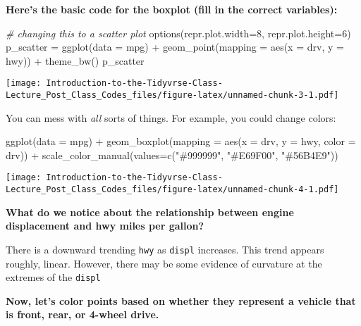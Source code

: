 \documentclass[
]{article}
\newenvironment{Shaded}{\begin{snugshade}}{\end{snugshade}}
\newcommand{\AttributeTok}[1]{\textcolor[rgb]{0.77,0.63,0.00}{#1}}
\newcommand{\CommentTok}[1]{\textcolor[rgb]{0.56,0.35,0.01}{\textit{#1}}}
\newcommand{\DecValTok}[1]{\textcolor[rgb]{0.00,0.00,0.81}{#1}}
\newcommand{\FunctionTok}[1]{\textcolor[rgb]{0.00,0.00,0.00}{#1}}
\newcommand{\NormalTok}[1]{#1}
\newcommand{\OtherTok}[1]{\textcolor[rgb]{0.56,0.35,0.01}{#1}}
\newcommand{\SpecialCharTok}[1]{\textcolor[rgb]{0.00,0.00,0.00}{#1}}
\newcommand{\StringTok}[1]{\textcolor[rgb]{0.31,0.60,0.02}{#1}}
\begin{document}
\textbf{Here's the basic code for the boxplot (fill in the correct
variables):}

\begin{Shaded}
\begin{Highlighting}[]
\CommentTok{\# changing this to a scatter plot }
\FunctionTok{options}\NormalTok{(}\AttributeTok{repr.plot.width=}\DecValTok{8}\NormalTok{, }\AttributeTok{repr.plot.height=}\DecValTok{6}\NormalTok{)}
\NormalTok{p\_scatter }\OtherTok{=} \FunctionTok{ggplot}\NormalTok{(}\AttributeTok{data =}\NormalTok{ mpg) }\SpecialCharTok{+} 
  \FunctionTok{geom\_point}\NormalTok{(}\AttributeTok{mapping =} \FunctionTok{aes}\NormalTok{(}\AttributeTok{x =}\NormalTok{ drv, }\AttributeTok{y =}\NormalTok{ hwy)) }\SpecialCharTok{+} 
  \FunctionTok{theme\_bw}\NormalTok{()}
\NormalTok{p\_scatter}
\end{Highlighting}
\end{Shaded}

\texttt{[image: Introduction-to-the-Tidyvrse-Class-Lecture\_Post\_Class\_Codes\_files/figure-latex/unnamed-chunk-3-1.pdf]}

You can mess with \emph{all} sorts of things. For example, you could
change colors:

\begin{Shaded}
\begin{Highlighting}[]
\FunctionTok{ggplot}\NormalTok{(}\AttributeTok{data =}\NormalTok{ mpg) }\SpecialCharTok{+} 
  \FunctionTok{geom\_boxplot}\NormalTok{(}\AttributeTok{mapping =} \FunctionTok{aes}\NormalTok{(}\AttributeTok{x =}\NormalTok{ drv, }\AttributeTok{y =}\NormalTok{ hwy, }\AttributeTok{color =}\NormalTok{ drv)) }\SpecialCharTok{+} 
\FunctionTok{scale\_color\_manual}\NormalTok{(}\AttributeTok{values=}\FunctionTok{c}\NormalTok{(}\StringTok{"\#999999"}\NormalTok{, }\StringTok{"\#E69F00"}\NormalTok{, }\StringTok{"\#56B4E9"}\NormalTok{))}
\end{Highlighting}
\end{Shaded}

\texttt{[image: Introduction-to-the-Tidyvrse-Class-Lecture\_Post\_Class\_Codes\_files/figure-latex/unnamed-chunk-4-1.pdf]}

\textbf{What do we notice about the relationship between engine
displacement and hwy miles per gallon?}

There is a downward trending \texttt{hwy} as \texttt{displ} increases.
This trend appears roughly, linear. However, there may be some evidence
of curvature at the extremes of the \texttt{displ}

\textbf{Now, let's color points based on whether they represent a
vehicle that is front, rear, or 4-wheel drive.}
\end{document}
